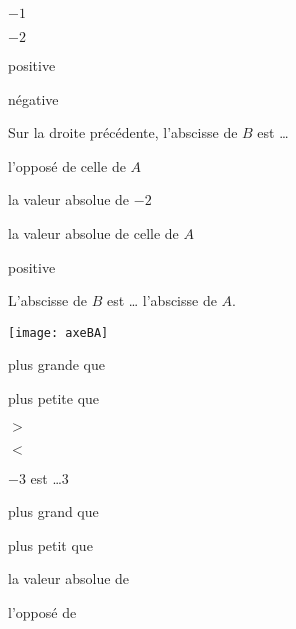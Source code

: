 \begin{QCM}
\begin{GroupeQCM}
\begin{exercice}
      \begin{ChoixQCM}{4}
      \item $-1$
      \item $-2$
      \item positive
      \item négative
      \end{ChoixQCM}
\begin{corrige}
   \end{corrige}
    \end{exercice}
    
    
     \begin{exercice}
      Sur la droite précédente, l'abscisse de $B$ est \ldots
      \begin{ChoixQCM}{4}
      \item l'opposé de celle de $A$
      \item la valeur absolue de $-2$
      \item la valeur absolue de celle de $A$
      \item positive
      \end{ChoixQCM}
\begin{corrige}
   \end{corrige}
    \end{exercice}
    

    \begin{exercice}
      L'abscisse de $B$ est \ldots \hspace{0.4em} l'abscisse de $A$. 
      
\vspace{-2em}
\begin{center} \texttt{[image: axeBA]} \end{center}

      \begin{ChoixQCM}{4}
      \item plus grande que
      \item plus petite que
      \item $>$
      \item $<$
      \end{ChoixQCM}
\begin{corrige}
   \end{corrige}
    \end{exercice}
    
 
     \begin{exercice}
      $-3$ est \ldots 3
      \begin{ChoixQCM}{4}
      \item plus grand que
      \item plus petit que
      \item la valeur absolue de
      \item l'opposé de
      \end{ChoixQCM}
\begin{corrige}
   \end{corrige}
    \end{exercice}
 \end{GroupeQCM}
\end{QCM}
 
